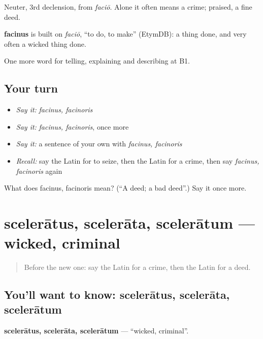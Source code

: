 Neuter, 3rd declension, from \emph{faciō}. Alone it often means a crime; praised, a fine deed.

\begin{cousinweb}
\textbf{facinus} is built on \emph{faciō}, \textquotedblleft{}to do, to make\textquotedblright{} (EtymDB): a thing done, and very often a wicked thing done.
\end{cousinweb}

\begin{grammarlens}[title={What you've built}]
One more word for telling, explaining and describing at B1.
\end{grammarlens}

\subsection*{Your turn}
\begin{itemize}
\raggedright
  \item \emph{Say it:} \emph{facinus, facinoris}
  \item \emph{Say it:} \emph{facinus, facinoris}, once more
  \item \emph{Say it:} a sentence of your own with \emph{facinus, facinoris}
  \item \emph{Recall:} say the Latin for to seize, then the Latin for a crime, then say \emph{facinus, facinoris} again
\end{itemize}

\begin{tcolorbox}[breakable,colback=teal!4,colframe=teal!35!black,title={Before you move on}]
What does facinus, facinoris mean? (\textquotedblleft{}A deed; a bad deed\textquotedblright{}.) Say it once more.
\end{tcolorbox}
\section[scelerātus, scelerāta, scelerātum]{scelerātus, scelerāta, scelerātum — wicked, criminal}

\label{lesson:LA-C305-sceleratus}



\begin{quote}
Before the new one: say the Latin for a crime, then the Latin for a deed.
\end{quote}

\subsection*{You'll want to know: scelerātus, scelerāta, scelerātum}
\textbf{scelerātus, scelerāta, scelerātum} — \textquotedblleft{}wicked, criminal\textquotedblright{}.

